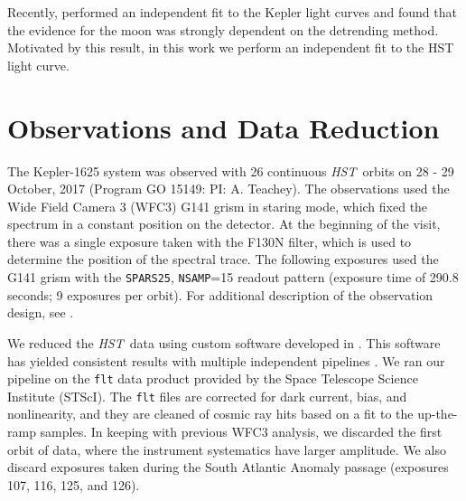 \documentclass[twocolumn]{aastex62}
\newcommand{\project}[1]{\textsl{#1}}
\newcommand{\HST}{\project{HST}}
\newcommand{\Kepler}{\project{Kepler}}
\begin{document}
Recently, \cite{rodenbeck18} performed an independent fit to the Kepler light curves and found that the evidence for the moon was strongly dependent on the detrending method. Motivated by this result, in this work we perform an independent fit to the HST light curve.





\section{Observations and Data Reduction} \label{sec:data}
The Kepler-1625 system was observed with 26 continuous \HST\ orbits on 28 - 29 October, 2017 (Program GO 15149: PI: A. Teachey). The observations used the Wide Field Camera 3 (WFC3) G141 grism in staring mode, which fixed the spectrum in a constant position on the detector.  At the beginning of the visit, there was a single exposure taken with the F130N filter, which is used to determine the position of the spectral trace. The following exposures used the G141 grism with the \texttt{SPARS25}, \texttt{NSAMP}=15 readout pattern (exposure time of 290.8 seconds; 9 exposures per orbit). For additional description of the observation design, see \cite{teachey18b}.  


We reduced the \HST\ data using custom software developed in \cite{kreidberg14a}.  This software has yielded consistent results with multiple independent pipelines \citep[e.g.][]{knutson14b, spake18}.  We ran our pipeline on the \texttt{flt} data product provided by the Space Telescope Science Institute (STScI). The \texttt{flt} files are corrected for dark current, bias, and nonlinearity, and they are cleaned of cosmic ray hits based on a fit to the up-the-ramp samples. In keeping with previous WFC3 analysis, we discarded the first orbit of data, where the instrument systematics have larger amplitude. We also discard exposures taken during the South Atlantic Anomaly passage (exposures 107, 116, 125, and 126).
\end{document}
